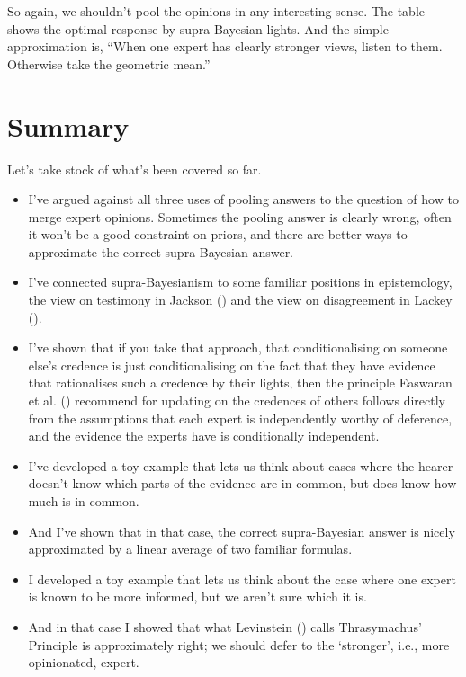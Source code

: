 \documentclass[
  10pt,
  letterpaper,
  DIV=11,
  numbers=noendperiod,
  twoside]{scrartcl}
\providecommand{\tightlist}{%
  \setlength{\itemsep}{0pt}\setlength{\parskip}{0pt}}\usepackage{longtable,booktabs,array}
\begin{document}
So again, we shouldn't pool the opinions in any interesting sense. The
table shows the optimal response by supra-Bayesian lights. And the
simple approximation is, ``When one expert has clearly stronger views,
listen to them. Otherwise take the geometric mean.''

\section{Summary}\label{summary}

Let's take stock of what's been covered so far.

\begin{itemize}
\tightlist
\item
  I've argued against all three uses of pooling answers to the question
  of how to merge expert opinions. Sometimes the pooling answer is
  clearly wrong, often it won't be a good constraint on priors, and
  there are better ways to approximate the correct supra-Bayesian
  answer.
\item
  I've connected supra-Bayesianism to some familiar positions in
  epistemology, the view on testimony in Jackson
  () and the view on disagreement in
  Lackey ().
\item
  I've shown that if you take that approach, that conditionalising on
  someone else's credence is just conditionalising on the fact that they
  have evidence that rationalises such a credence by their lights, then
  the principle Easwaran et al. ()
  recommend for updating on the credences of others follows directly
  from the assumptions that each expert is independently worthy of
  deference, and the evidence the experts have is conditionally
  independent.
\item
  I've developed a toy example that lets us think about cases where the
  hearer doesn't know which parts of the evidence are in common, but
  does know how much is in common.
\item
  And I've shown that in that case, the correct supra-Bayesian answer is
  nicely approximated by a linear average of two familiar formulas.
\item
  I developed a toy example that lets us think about the case where one
  expert is known to be more informed, but we aren't sure which it is.
\item
  And in that case I showed that what Levinstein
  () calls Thrasymachus' Principle is
  approximately right; we should defer to the `stronger', i.e., more
  opinionated, expert.
\end{itemize}
\end{document}
